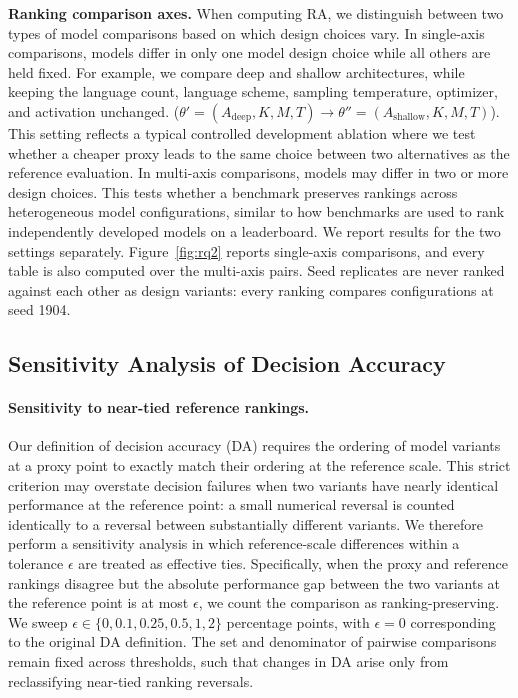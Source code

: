 \textbf{Ranking comparison axes.}
When computing RA, we distinguish between two types of model comparisons based on which design choices vary.
In single-axis comparisons, models differ in only one model design choice while all others are held fixed. 
For example, we compare deep and shallow architectures, while keeping the language count, language scheme, sampling temperature, optimizer, and activation unchanged.
($\theta' = (A_\mathrm{deep},K,M,T) \rightarrow \theta'' = (A_\mathrm{shallow},K,M,T)$).
This setting reflects a typical controlled development ablation where we test whether a cheaper proxy leads to the same choice between two alternatives as the reference evaluation.
In multi-axis comparisons, models may differ in two or more design choices. This tests whether a benchmark preserves rankings across heterogeneous model configurations, similar to how benchmarks are used to rank independently developed models on a leaderboard.
We report results for the two settings separately. Figure~\ref{fig:rq2} reports single-axis comparisons, and every table is also computed over the multi-axis pairs. Seed replicates are never ranked against each other as design variants: every ranking compares configurations at seed 1904.

\subsection{Sensitivity Analysis of Decision Accuracy}
\label{app:da-sensitivity}

\paragraph{Sensitivity to near-tied reference rankings.}
Our definition of decision accuracy (DA) requires the ordering of model variants at a proxy point to exactly match their ordering at the reference scale. This strict criterion may overstate decision failures when two variants have nearly identical performance at the reference point: a small numerical reversal is counted identically to a reversal between substantially different variants. We therefore perform a sensitivity analysis in which reference-scale differences within a tolerance $\epsilon$ are treated as effective ties. Specifically, when the proxy and reference rankings disagree but the absolute performance gap between the two variants at the reference point is at most $\epsilon$, we count the comparison as ranking-preserving. We sweep $\epsilon \in \{0, 0.1, 0.25, 0.5, 1, 2\}$ percentage points, with $\epsilon=0$ corresponding to the original DA definition. The set and denominator of pairwise comparisons remain fixed across thresholds, such that changes in DA arise only from reclassifying near-tied ranking reversals.

